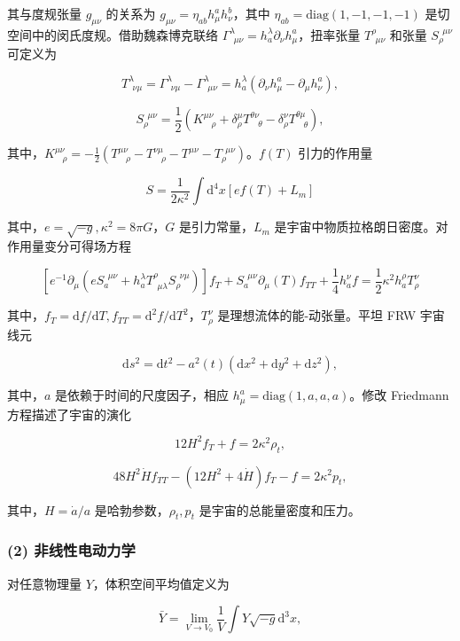 \documentclass[aps,prl,preprint,groupedaddress,showkeys]{revtex4-2}
\begin{document}
其与度规张量 $g_{\mu\nu}$ 的关系为 $ g_{\mu\nu}=\eta_{ab}h_\mu^ah_\nu^b$，其中 $\eta_{ab}=\mathrm{diag}(1,-1,-1,-1)$ 是切空间中的闵氏度规。借助魏森博克联络 $\Gamma_{~~\mu\nu}^{\lambda}=h_a^\lambda \partial_\nu h_\mu^a$，扭率张量 $T^\rho_{~~\mu\nu}$ 和张量 $S_\rho^{~~\mu\nu}$ 可定义为

$$
T^{\lambda}_{~~\nu\mu} = \Gamma^\lambda_{~~\nu\mu} - \Gamma^\lambda_{~~\mu\nu} = h_a^\lambda\left(\partial_\nu h_\mu^a - \partial_\mu h_\nu^a \right),
$$

$$
S_\rho^{~~\mu\nu} = \frac{1 }{2 } \left(K^{\mu\nu}_{~~~~\rho} + \delta_\rho^\mu T^{\theta\nu}_{~~~~\theta} - \delta_\rho^\nu T^{\theta\mu}_{~~~~\theta} \right),
$$

其中，$K^{\mu\nu}_{~~~~\rho}=-\frac{1}{2}(T^{\mu\nu}_{~~~~\rho}-T^{\nu\mu}_{~~~~\rho}-T^{\mu\nu}-T_\rho^{~~\mu\nu}) $。$f(T)$ 引力的作用量

$$
S = \frac{1}{2\kappa^2}\int \mathrm{d}^4 x [ef(T)+L_m]
$$

其中，$e=\sqrt{-g},\kappa^2=8\pi G$，$G$ 是引力常量，$L_m$ 是宇宙中物质拉格朗日密度。对作用量变分可得场方程

$$
\left[e^{-1}\partial_\mu \left(e S_a^{~~\mu\nu} + h_a^\lambda T^\rho_{~~\mu\lambda} S_\rho^{~~\nu\mu} \right) \right] f_T + S_a^{~~\mu\nu} \partial_\mu(T) f_{TT} + \frac{1 }{4 } h_a^\nu f
=\frac{1 }{2 } \kappa^2 h_a^\rho T_\rho^\nu
$$

其中，$f_T=\mathrm{d}f/\mathrm{d}T,f_{TT}=\mathrm{d}^2f/\mathrm{d}T^2$，$T_\rho^\nu$ 是理想流体的能-动张量。平坦 FRW 宇宙线元

$$
\mathrm{d}s^2
=\mathrm{d}t^2 - a^2(t)\left(\mathrm{d}x^2+\mathrm{d}y^2+\mathrm{d}z^2 \right),
$$

其中，$a$ 是依赖于时间的尺度因子，相应 $h_\mu^a=\mathrm{diag}(1,a,a,a)$。修改 Friedmann 方程描述了宇宙的演化

$$
12 H^2 f_T + f = 2\kappa^2 \rho_t,
$$

$$
48H^2\dot{H} f_{TT} - \left(12 H^2 + 4\dot{H} \right) f_T - f= 2\kappa^2 p_t,
$$

其中，$H=\dot{a}/a$ 是哈勃参数，$\rho_t,p_t$ 是宇宙的总能量密度和压力。

\subsubsection{(2) 非线性电动力学}

对任意物理量 $Y$，体积空间平均值定义为

$$
\bar{Y}
=\lim_{V\to V_0} \frac{1 }{V } \int Y\sqrt{-g} \mathrm{d}^3 x,
$$
\end{document}
